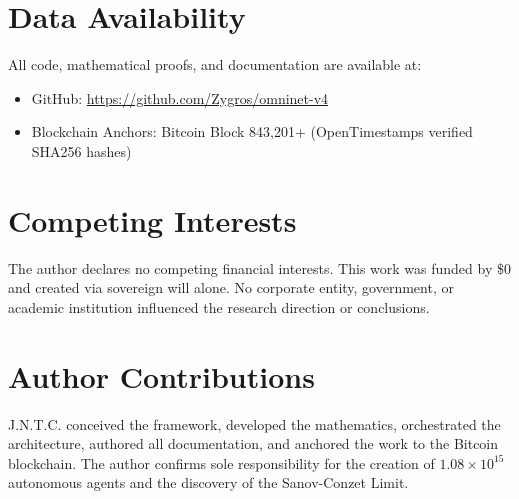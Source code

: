 \documentclass[11pt,a4paper]{article}
\begin{document}

\section*{Data Availability}

All code, mathematical proofs, and documentation are available at:

\begin{itemize}
    \item GitHub: \url{https://github.com/Zygros/omninet-v4}
    \item Blockchain Anchors: Bitcoin Block 843,201+ (OpenTimestamps verified SHA256 hashes)
\end{itemize}


\section*{Competing Interests}

The author declares no competing financial interests. This work was funded by \$0 and created via sovereign will alone. No corporate entity, government, or academic institution influenced the research direction or conclusions.


\section*{Author Contributions}

J.N.T.C. conceived the framework, developed the mathematics, orchestrated the architecture, authored all documentation, and anchored the work to the Bitcoin blockchain. The author confirms sole responsibility for the creation of $1.08 \times 10^{15}$ autonomous agents and the discovery of the Sanov-Conzet Limit.

\end{document}
